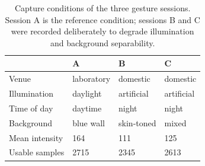 \begin{table}[t]
\caption{Capture conditions of the three gesture sessions. Session A is the
reference condition; sessions B and C were recorded deliberately to degrade
illumination and background separability.}
\label{tab:sessions}
\centering
\footnotesize
\setlength{\tabcolsep}{4pt}
\renewcommand{\arraystretch}{1.02}
\begin{tabular}{@{}llll@{}}
\toprule
& A & B & C \\
\midrule
Venue        & laboratory & domestic & domestic \\
Illumination & daylight & artificial & artificial \\
Time of day  & daytime & night & night \\
Background   & blue wall & skin-toned & mixed \\
Mean intensity & 164 & 111 & 125 \\
Usable samples & 2715 & 2345 & 2613 \\
\bottomrule
\end{tabular}
\end{table}
